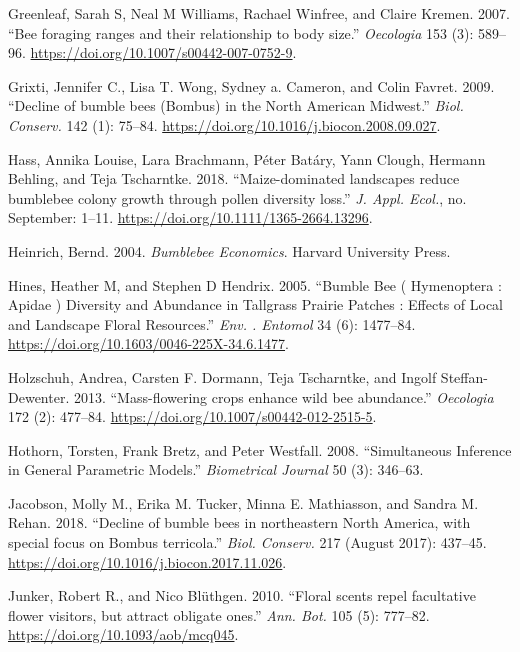 \documentclass[11pt,]{article}
\begin{document}
\leavevmode\hypertarget{ref-Greenleaf2007b}{}%
Greenleaf, Sarah S, Neal M Williams, Rachael Winfree, and Claire Kremen.
2007. ``Bee foraging ranges and their relationship to body size.''
\emph{Oecologia} 153 (3): 589--96.
\url{https://doi.org/10.1007/s00442-007-0752-9}.

\leavevmode\hypertarget{ref-Grixti2009}{}%
Grixti, Jennifer C., Lisa T. Wong, Sydney a. Cameron, and Colin Favret.
2009. ``Decline of bumble bees (Bombus) in the North American Midwest.''
\emph{Biol. Conserv.} 142 (1): 75--84.
\url{https://doi.org/10.1016/j.biocon.2008.09.027}.

\leavevmode\hypertarget{ref-Hass2018a}{}%
Hass, Annika Louise, Lara Brachmann, Péter Batáry, Yann Clough, Hermann
Behling, and Teja Tscharntke. 2018. ``Maize-dominated landscapes reduce
bumblebee colony growth through pollen diversity loss.'' \emph{J. Appl.
Ecol.}, no. September: 1--11.
\url{https://doi.org/10.1111/1365-2664.13296}.

\leavevmode\hypertarget{ref-Heinrich2004}{}%
Heinrich, Bernd. 2004. \emph{Bumblebee Economics}. Harvard University
Press.

\leavevmode\hypertarget{ref-Hines2005}{}%
Hines, Heather M, and Stephen D Hendrix. 2005. ``Bumble Bee (
Hymenoptera : Apidae ) Diversity and Abundance in Tallgrass Prairie
Patches : Effects of Local and Landscape Floral Resources.'' \emph{Env.
. Entomol} 34 (6): 1477--84.
\url{https://doi.org/10.1603/0046-225X-34.6.1477}.

\leavevmode\hypertarget{ref-Holzschuh2013}{}%
Holzschuh, Andrea, Carsten F. Dormann, Teja Tscharntke, and Ingolf
Steffan-Dewenter. 2013. ``Mass-flowering crops enhance wild bee
abundance.'' \emph{Oecologia} 172 (2): 477--84.
\url{https://doi.org/10.1007/s00442-012-2515-5}.

\leavevmode\hypertarget{ref-multcomp}{}%
Hothorn, Torsten, Frank Bretz, and Peter Westfall. 2008. ``Simultaneous
Inference in General Parametric Models.'' \emph{Biometrical Journal} 50
(3): 346--63.

\leavevmode\hypertarget{ref-Jacobson2018a}{}%
Jacobson, Molly M., Erika M. Tucker, Minna E. Mathiasson, and Sandra M.
Rehan. 2018. ``Decline of bumble bees in northeastern North America,
with special focus on Bombus terricola.'' \emph{Biol. Conserv.} 217
(August 2017): 437--45.
\url{https://doi.org/10.1016/j.biocon.2017.11.026}.

\leavevmode\hypertarget{ref-Junker2010}{}%
Junker, Robert R., and Nico Blüthgen. 2010. ``Floral scents repel
facultative flower visitors, but attract obligate ones.'' \emph{Ann.
Bot.} 105 (5): 777--82. \url{https://doi.org/10.1093/aob/mcq045}.
\end{document}
